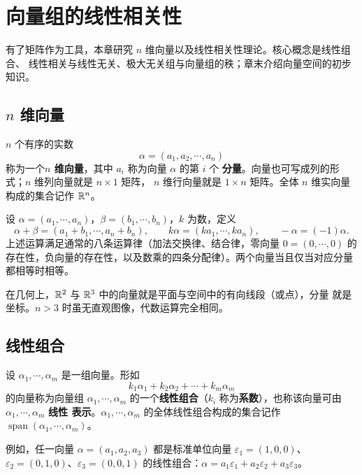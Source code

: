 \chapter{向量组的线性相关性}

有了矩阵作为工具，本章研究 $n$ 维向量以及线性相关性理论。核心概念是线性组合、
线性相关与线性无关、极大无关组与向量组的秩；章末介绍向量空间的初步知识。

\section{$n$ 维向量}

\begin{definition}\label{def:n-vector}
$n$ 个有序的实数
\[
  \alpha=(a_1,a_2,\cdots,a_n)
\]
称为一个\textbf{$n$ 维向量}，其中 $a_i$ 称为向量 $\alpha$ 的第 $i$ 个
\textbf{分量}。向量也可写成列的形式；$n$ 维列向量就是 $n\times1$ 矩阵，
$n$ 维行向量就是 $1\times n$ 矩阵。全体 $n$ 维实向量构成的集合记作 $\mathbb{R}^n$。
\end{definition}

设 $\alpha=(a_1,\cdots,a_n)$，$\beta=(b_1,\cdots,b_n)$，$k$ 为数，定义
\[
  \alpha+\beta=(a_1+b_1,\cdots,a_n+b_n),\qquad
  k\alpha=(ka_1,\cdots,ka_n),\qquad
  -\alpha=(-1)\alpha .
\]
上述运算满足通常的八条运算律（加法交换律、结合律，零向量 $0=(0,\cdots,0)$
的存在性，负向量的存在性，以及数乘的四条分配律）。两个向量当且仅当对应分量
都相等时相等。

在几何上，$\mathbb{R}^2$ 与 $\mathbb{R}^3$ 中的向量就是平面与空间中的有向线段（或点），分量
就是坐标。$n>3$ 时虽无直观图像，代数运算完全相同。

\section{线性组合}

\begin{definition}\label{def:combination}
设 $\alpha_1,\cdots,\alpha_m$ 是一组向量。形如
\[
  k_1\alpha_1+k_2\alpha_2+\cdots+k_m\alpha_m
\]
的向量称为向量组 $\alpha_1,\cdots,\alpha_m$ 的一个\textbf{线性组合}（$k_i$
称为\textbf{系数}），也称该向量可由 $\alpha_1,\cdots,\alpha_m$ \textbf{线性
表示}。$\alpha_1,\cdots,\alpha_m$ 的全体线性组合构成的集合记作
$\operatorname{span}(\alpha_1,\cdots,\alpha_m)$。
\end{definition}

例如，任一向量 $\alpha=(a_1,a_2,a_3)$ 都是标准单位向量
$\varepsilon_1=(1,0,0)$、$\varepsilon_2=(0,1,0)$、$\varepsilon_3=(0,0,1)$
的线性组合：$\alpha=a_1\varepsilon_1+a_2\varepsilon_2+a_3\varepsilon_3$。

